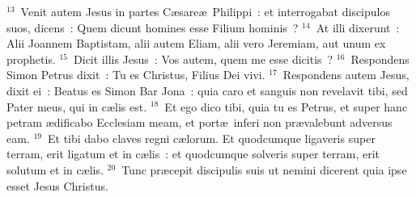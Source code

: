 ${}^{13}$~Venit autem Jesus in partes C\ae sare\ae\ Philippi~: et interrogabat discipulos suos, dicens~: Quem dicunt homines esse Filium hominis~?
${}^{14}$~At illi dixerunt~: Alii Joannem Baptistam, alii autem Eliam, alii vero Jeremiam, aut unum ex prophetis.
${}^{15}$~Dicit illis Jesus~: Vos autem, quem me esse dicitis~?
${}^{16}$~Respondens Simon Petrus dixit~: Tu es Christus, Filius Dei vivi.
${}^{17}$~Respondens autem Jesus, dixit ei~: Beatus es Simon Bar Jona~: quia caro et sanguis non revelavit tibi, sed Pater meus, qui in c\ae lis est.
${}^{18}$~Et ego dico tibi, quia tu es Petrus, et super hanc petram \ae dificabo Ecclesiam meam, et port\ae\ inferi non pr\ae valebunt adversus eam.
${}^{19}$~Et tibi dabo claves regni c\ae lorum. Et quodcumque ligaveris super terram, erit ligatum et in c\ae lis~: et quodcumque solveris super terram, erit solutum et in c\ae lis.
${}^{20}$~Tunc pr\ae cepit discipulis suis ut nemini dicerent quia ipse esset Jesus Christus.


